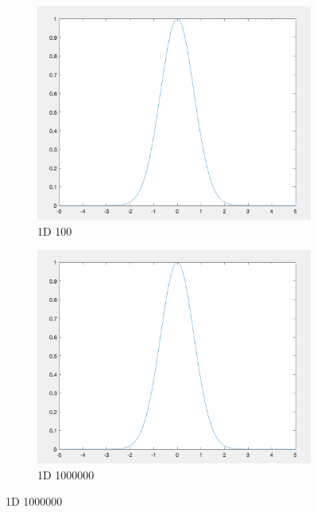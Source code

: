 \documentclass{article}
\begin{document}
\begin{figure}[H]
    \begin{subfigure}[h]{0.45\linewidth}
        \includegraphics[width=\linewidth]{imgs/q3a_1d_100.png}
        \caption{1D 100}
    \end{subfigure}
    \hfill
    \begin{subfigure}[h]{0.45\linewidth}
        \includegraphics[width=\linewidth]{imgs/q3a_1d_1000000.png}
        \caption{1D 1000000}
    \end{subfigure}
\end{figure}
\end{document}
